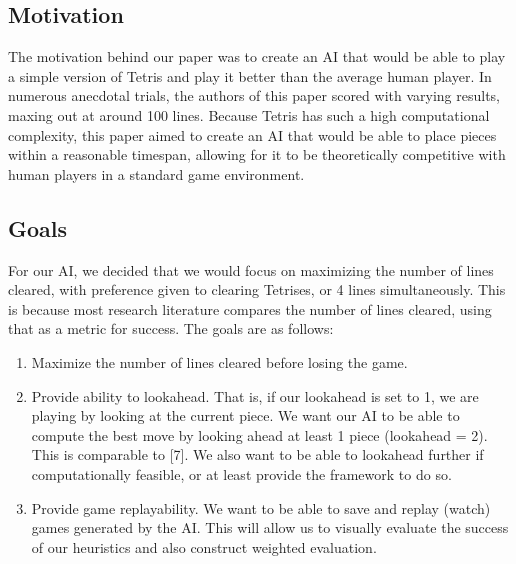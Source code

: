 \documentclass[12pt]{article}
\begin{document}
\subsection{Motivation}
The motivation behind our paper was to create an AI that would be able to play a simple version of Tetris and play it better than the average human player. In numerous anecdotal trials, the authors of this paper scored with varying results, maxing out at around 100 lines. Because Tetris has such a high computational complexity, this paper aimed to create an AI that would be able to place pieces within a reasonable timespan, allowing for it to be theoretically competitive with human players in a standard game environment. 

\subsection{Goals}
For our AI, we decided that we would focus on maximizing the number of lines cleared, with preference given to clearing Tetrises, or 4 lines simultaneously. This is because most research literature compares the number of lines cleared, using that as a metric for success. The goals are as follows:
\begin{enumerate}
\item Maximize the number of lines cleared before losing the game.
\item Provide ability to lookahead. That is, if our lookahead is set to 1, we are playing by looking at the current piece. We want our AI to be able to compute the best move by looking ahead at least 1 piece (lookahead = 2). This is comparable to [7]. We also want to be able to lookahead further if computationally feasible, or at least provide the framework to do so.
\item Provide game replayability. We want to be able to save and replay (watch) games generated by the AI. This will allow us to visually evaluate the success of our heuristics and also construct weighted evaluation.
\end{enumerate}
\end{document}

